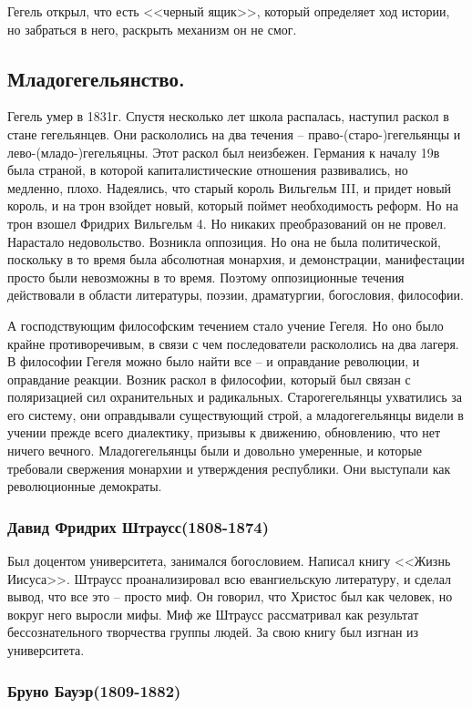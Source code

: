 Гегель открыл, что есть <<черный ящик>>, который определяет ход истории, но забраться в него, раскрыть механизм он не смог.
\subsection{Младогегельянство.}

Гегель умер в 1831г. Спустя несколько лет школа распалась, наступил раскол в стане гегельянцев. Они раскололись на два течения – право-(старо-)гегельянцы и лево-(младо-)гегельяцны. Этот раскол был неизбежен. Германия к началу 19в была страной, в которой капиталистические отношения развивались, но медленно, плохо. Надеялись, что старый король Вильгельм III, и придет новый король, и на трон взойдет новый, который поймет необходимость реформ. Но на трон взошел Фридрих Вильгельм 4. Но никаких преобразований он не провел. Нарастало недовольство. Возникла оппозиция. Но она не была политической, поскольку в то время была абсолютная монархия, и демонстрации, манифестации просто были невозможны в то время. Поэтому оппозиционные течения действовали в области литературы, поэзии, драматургии, богословия, философии.

А господствующим философским течением стало учение Гегеля. Но оно было крайне противоречивым, в связи с чем последователи раскололись на два лагеря. В философии Гегеля можно было найти все – и оправдание революции, и оправдание реакции. Возник раскол в философии, который был связан с поляризацией сил охранительных и радикальных. Старогегельянцы ухватились за его систему, они оправдывали существующий строй, а младогегельянцы видели в учении прежде всего диалектику, призывы к движению, обновлению, что нет ничего вечного. Младогегельянцы были и довольно умеренные, и которые требовали свержения монархии и утверждения республики. Они выступали как революционные демократы.
\subsubsection{Давид Фридрих Штраусс(1808-1874)}

Был доцентом университета, занимался богословием. Написал книгу <<Жизнь Иисуса>>. Штраусс проанализировал всю евангиельскую литературу, и сделал вывод, что все это – просто миф. Он говорил, что Христос был как человек, но вокруг него выросли мифы. Миф же Штраусс рассматривал как результат бессознательного творчества группы людей. За свою книгу был изгнан из университета.
\subsubsection{Бруно Бауэр(1809-1882)}


